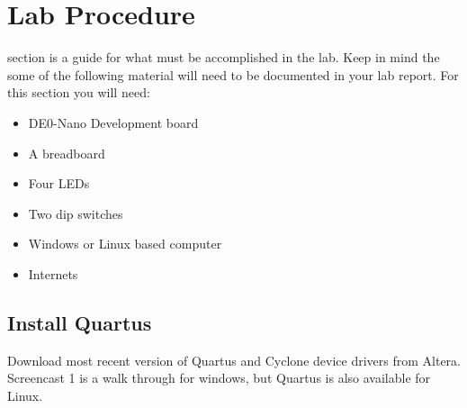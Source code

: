 \documentclass[12pt,journal]{IEEEtran}
\begin{document}

  \section{Lab Procedure}
     section is a guide for what must be accomplished in the lab. Keep in mind the some of
    the following material will need to be documented in your lab report. For this section you will need:
    \begin{itemize}
      \item DE0-Nano Development board
      \item A breadboard
      \item Four LEDs
      \item Two dip switches
      \item Windows or Linux based computer
      \item Internets
    \end{itemize}

    \subsection{Install Quartus}
    Download most recent version of Quartus and Cyclone device drivers from Altera. Screencast 1
    is a walk through for windows, but Quartus is also available for Linux.

\end{document}
